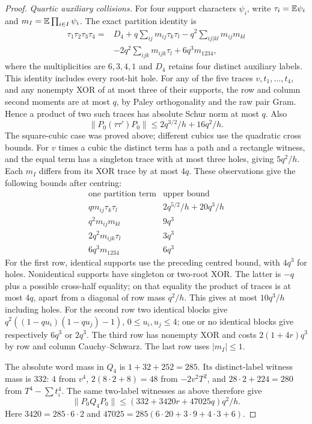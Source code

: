 \begin{proof}
\emph{Quartic auxiliary collisions.}
For four support characters $\psi_i$, write $\tau_i=\mathbb E\psi_i$ and
$m_I=\mathbb E\prod_{i\in I}\psi_i$. The exact partition identity is
\begin{align*}
 \tau_1\tau_2\tau_3\tau_4={}&D_4
 +q\sum_{ij}m_{ij}\tau_k\tau_l
 -q^2\sum_{ij|kl}m_{ij}m_{kl}\\
 &-2q^2\sum_{ijk}m_{ijk}\tau_l+6q^3m_{1234},
\end{align*}
where the multiplicities are $6,3,4,1$ and $D_4$ retains four
distinct auxiliary labels. This identity includes every root-hit hole.
For any of the five traces $v,t_1,\ldots,t_4$, and any nonempty
XOR of at most three of their supports, the row and column second
moments are at most $q$, by Paley orthogonality and the raw pair
Gram. Hence a product of two such traces has absolute Schur norm
at most $q$. Also
\[
 \|P_0(\tau\tau')P_0\|\le2q^{3/2}/h+16q^2/h.
\]
The square-cubic case was proved above; different cubics use the
quadratic cross bounds. For $v$ times a cubic the distinct term
has a path and a rectangle witness, and the equal term has a
singleton trace with at most three holes, giving $5q^2/h$.
Each $m_I$ differs from its XOR trace by at most $4q$.
These observations give the following bounds after centring:
\[
\begin{array}{c|c}
 \text{one partition term}&\text{upper bound}\\ \hline
 qm_{ij}\tau_k\tau_l&2q^{5/2}/h+20q^3/h\\
 q^2m_{ij}m_{kl}&9q^3\\
 2q^2m_{ijk}\tau_l&3q^3\\
 6q^3m_{1234}&6q^3
\end{array}
\]
For the first row, identical supports use the preceding centred
bound, with $4q^3$ for holes. Nonidentical supports have singleton
or two-root XOR. The latter is $-q$ plus a possible cross-half
equality; on that equality the product of traces is at most $4q$,
apart from a diagonal of row mass $q^2/h$. This gives at most
$10q^3/h$ including holes. For the second row two identical
blocks give $q^2((1-qu_i)(1-qu_j)-1)$, $0\le u_i,u_j\le4$;
one or no identical blocks give respectively $6q^3$ or $2q^3$.
The third row has nonempty XOR and costs $2(1+4r)q^3$ by
row and column Cauchy--Schwarz. The last row uses $|m_I|\le1$.

The absolute word mass in $Q_4$ is $1+32+252=285$.
Its distinct-label witness mass is $332$: $4$ from $v^4$,
$2(8\cdot2+8)=48$ from $-2v^2T^2$, and
$28\cdot2+224=280$ from $T^4-\sum t_i^4$.
The same two-label witnesses as above therefore give
\[
 \|P_0Q_4P_0\|\le(332+3420r+47025q)q^2/h.
\]
Here $3420=285\cdot6\cdot2$ and
$47025=285(6\cdot20+3\cdot9+4\cdot3+6)$.


\end{proof}
